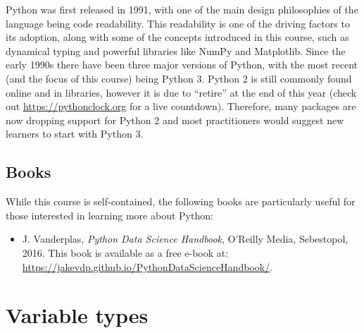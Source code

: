 \documentclass[a4paper]{article}
\begin{document}
Python was first released in 1991, with one of the main design philosophies of the language being code readability. 
This readability is one of the driving factors to its adoption, along with some of the concepts introduced in this course, such as dynamical typing and powerful libraries like NumPy and Matplotlib. 
Since the early 1990s there have been three major versions of Python, with the most recent (and the focus of this course) being Python 3. 
Python 2 is still commonly found online and in libraries, however it is due to ``retire'' at the end of this year (check out \url{https://pythonclock.org} for a live countdown). 
Therefore, many packages are now dropping support for Python 2 and most practitioners would suggest new learners to start with Python 3. 

\subsection{Books}

While this course is self-contained, the following books are particularly useful for those interested in learning more about Python: 
\begin{itemize}
	\item J. Vanderplas, \emph{Python Data Science Handbook}, O'Reilly Media, Sebestopol, 2016. This book is available as a free e-book at: \url{https://jakevdp.github.io/PythonDataScienceHandbook/}.
\end{itemize}

\section{Variable types}
\end{document}
